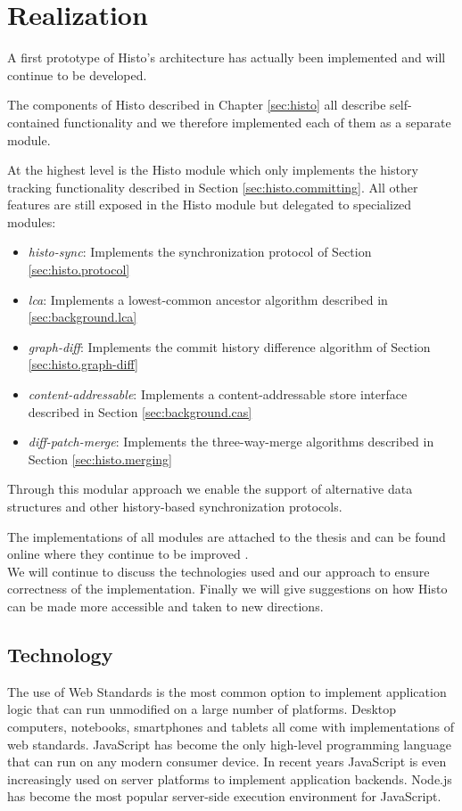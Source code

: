 
\chapter{Realization}
\label{sec:realization}
A first prototype of Histo's architecture has actually been implemented and will continue to be developed.

The components of Histo described in Chapter \ref{sec:histo} all describe self-contained functionality and we therefore implemented each of them as a separate module.

At the highest level is the Histo module which only implements the history tracking functionality described in Section \ref{sec:histo.committing}.
All other features are still exposed in the Histo module but delegated to specialized modules:

\begin{itemize}
\item \emph{histo-sync}: Implements the synchronization protocol of Section \ref{sec:histo.protocol}
\item \emph{lca}: Implements a lowest-common ancestor algorithm described in \ref{sec:background.lca}
\item \emph{graph-diff}: Implements the commit history difference algorithm of Section \ref{sec:histo.graph-diff}
\item \emph{content-addressable}: Implements a content-addressable store interface described in Section \ref{sec:background.cas}
\item \emph{diff-patch-merge}: Implements the three-way-merge algorithms described in Section \ref{sec:histo.merging}
\end{itemize}

Through this modular approach we enable the support of alternative data structures and other history-based synchronization protocols.

The implementations of all modules are attached to the thesis and can be found online where they continue to be improved \cite{histo-source}.\\

We will continue to discuss the technologies used and our approach to ensure correctness of the implementation.
Finally we will give suggestions on how Histo can be made more accessible and taken to new directions.

\section{Technology}
\label{sec:realization.technology}
The use of Web Standards is the most common option to implement application logic that can run unmodified on a large number of platforms.
Desktop computers, notebooks, smartphones and tablets all come with implementations of web standards.
JavaScript has become the only high-level programming language that can run on any modern consumer device.
In recent years JavaScript is even increasingly used on server platforms to implement application backends.
Node.js has become the most popular server-side execution environment for JavaScript.\\

